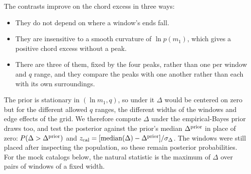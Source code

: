 \documentclass[%
 reprint,
 amsmath,amssymb,
 aps,
 prl,
 nofootinbib,nobibnotes,
 floatfix,
]{revtex4-2}
\begin{document}
The contrasts improve on the chord excess in three ways:
\begin{itemize}
    \item They do not depend on where a window's ends fall.
    \item They are insensitive to a smooth curvature of $\ln p(m_1)$, which gives a positive chord excess without a peak.
    \item There are three of them, fixed by the four peaks, rather than one per window and $q$ range, and they compare the peaks with one another rather than each with its own surroundings.
\end{itemize}
The prior is stationary in $(\ln m_1, q)$, so under it $\Delta$ would be centered on zero but for the different allowed $q$ ranges, the different widths of the windows and edge effects of the grid. We therefore compute $\Delta$ under the empirical-Bayes prior draws too, and test the posterior against the prior's median $\Delta^{\rm prior}$ in place of zero: $P(\Delta > \Delta^{\rm prior})$ and $z_{\rm cal} = [\mathrm{median}(\Delta) - \Delta^{\rm prior}] / \sigma_\Delta$. The windows were still placed after inspecting the population, so these remain posterior probabilities. For the mock catalogs below, the natural statistic is the maximum of $\Delta$ over pairs of windows of a fixed width.
\end{document}
